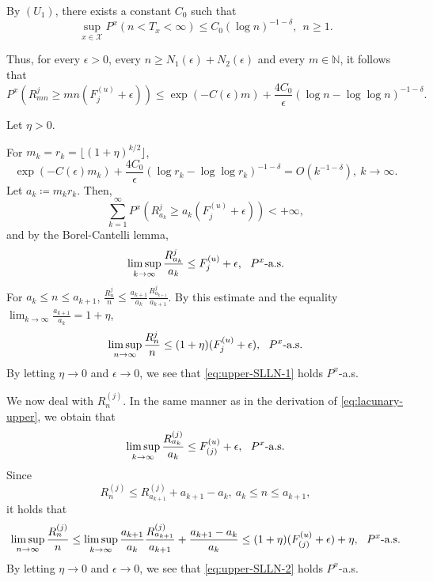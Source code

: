 \documentclass[a4paper, reqno, 11pt]{amsart}
\theoremstyle{definition}
\begin{document}
By $(U_1)$, there exists a constant $C_0$ such that 
\begin{equation}\label{eq:c0}
\sup_{x \in \mathcal{X}} P^x (n < T_x < \infty) \le C_0 (\log n)^{-1-\delta}, \ \ n \ge 1.  
\end{equation}

Thus, 
for every $\epsilon > 0$, every $n \ge N_1 (\epsilon) + N_2 (\epsilon)$ and every $m \in \mathbb{N}$, 
it follows that 
\begin{equation*}
P^x \left(R_{mn}^{j} \ge mn(F_j^{(u)} + \epsilon)\right) \le \exp\left(-C(\epsilon) m \right) + \frac{4C_0}{\epsilon} (\log n - \log \log n)^{-1-\delta}. 
\end{equation*}

Let $\eta > 0$. 



For $m_k = r_k =  \lfloor (1+\eta)^{k/2} \rfloor$, 
\[ \exp\left(-C(\epsilon) m_k \right) + \frac{4C_0}{\epsilon} (\log r_k - \log \log r_k)^{-1-\delta} = O\left(k^{-1-\delta}\right), \ k \to \infty. \]
Let $a_k \coloneqq m_k r_k$. 
Then, 
 \[ \sum_{k=1}^{\infty} P^x \left(R_{a_k}^{j} \ge a_k (F_j^{(u)} + \epsilon)\right) < +\infty, \]
and by the Borel-Cantelli lemma, 
\begin{equation}\label{eq:lacunary-upper} 
\limsup_{k \to \infty} \frac{R_{a_k}^{j}}{a_k} \le F_j^{(u)} + \epsilon, \ \textup{ $P^x$-a.s.}  
\end{equation}
For $a_k \le n \le a_{k+1}$, 
$\displaystyle \frac{R^j_n}{n} \le \frac{a_{k+1}}{a_k} \frac{R_{a_{k+1}}^{j}}{a_{k+1}}$. 
By this estimate and the equality $\displaystyle \lim_{k \to \infty} \frac{a_{k+1}}{a_k} = 1+\eta$, 
\[ \limsup_{n \to \infty} \frac{R_{n}^{j}}{n} \le (1+\eta)(F_j^{(u)} + \epsilon), \ \textup{ $P^x$-a.s.}  \]
By letting  $\eta \to 0$ and $\epsilon \to 0$, 
we see that  \eqref{eq:upper-SLLN-1} holds $P^x$-a.s.  


We now deal with $R^{(j)}_n$. 
In the same manner as in the derivation of \eqref{eq:lacunary-upper}, we obtain that   
\[ \limsup_{k \to \infty} \frac{R_{a_k}^{(j)}}{a_k} \le F_{(j)}^{(u)} + \epsilon, \ \textup{ $P^x$-a.s.}  \]
Since 
\[ R_n^{(j)} \le R_{a_{k+1}}^{(j)} + a_{k+1} - a_k,  \ a_k \le n \le a_{k+1},\]  
it holds that 
\[ \limsup_{n \to \infty} \frac{R_n^{(j)}}{n}  \le \limsup_{k \to \infty} \frac{a_{k+1}}{a_k} \frac{R_{a_{k+1}}^{(j)}}{a_{k+1}} + \frac{a_{k+1} - a_k}{a_k} \le (1+\eta)(F_{(j)}^{(u)} + \epsilon) + \eta, \ \textup{ $P^x$-a.s.}   \]
By letting  $\eta \to 0$ and $\epsilon \to 0$, 
we see that  \eqref{eq:upper-SLLN-2} holds $P^x$-a.s.  
\end{document}
